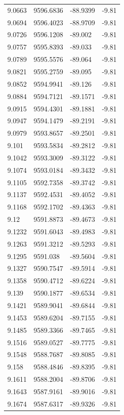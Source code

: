 \begin{table}[H]
\begin{tabular}{llll}
9.0663 & 9596.6836 & -88.9399 & -9.81 \\
9.0694 & 9596.4023 & -88.9709 & -9.81 \\
9.0726 & 9596.1208 & -89.002 & -9.81 \\
9.0757 & 9595.8393 & -89.033 & -9.81 \\
9.0789 & 9595.5576 & -89.064 & -9.81 \\
9.0821 & 9595.2759 & -89.095 & -9.81 \\
9.0852 & 9594.9941 & -89.126 & -9.81 \\
9.0884 & 9594.7121 & -89.1571 & -9.81 \\
9.0915 & 9594.4301 & -89.1881 & -9.81 \\
9.0947 & 9594.1479 & -89.2191 & -9.81 \\
9.0979 & 9593.8657 & -89.2501 & -9.81 \\
9.101 & 9593.5834 & -89.2812 & -9.81 \\
9.1042 & 9593.3009 & -89.3122 & -9.81 \\
9.1074 & 9593.0184 & -89.3432 & -9.81 \\
9.1105 & 9592.7358 & -89.3742 & -9.81 \\
9.1137 & 9592.4531 & -89.4052 & -9.81 \\
9.1168 & 9592.1702 & -89.4363 & -9.81 \\
9.12 & 9591.8873 & -89.4673 & -9.81 \\
9.1232 & 9591.6043 & -89.4983 & -9.81 \\
9.1263 & 9591.3212 & -89.5293 & -9.81 \\
9.1295 & 9591.038 & -89.5604 & -9.81 \\
9.1327 & 9590.7547 & -89.5914 & -9.81 \\
9.1358 & 9590.4712 & -89.6224 & -9.81 \\
9.139 & 9590.1877 & -89.6534 & -9.81 \\
9.1421 & 9589.9041 & -89.6844 & -9.81 \\
9.1453 & 9589.6204 & -89.7155 & -9.81 \\
9.1485 & 9589.3366 & -89.7465 & -9.81 \\
9.1516 & 9589.0527 & -89.7775 & -9.81 \\
9.1548 & 9588.7687 & -89.8085 & -9.81 \\
9.158 & 9588.4846 & -89.8395 & -9.81 \\
9.1611 & 9588.2004 & -89.8706 & -9.81 \\
9.1643 & 9587.9161 & -89.9016 & -9.81 \\
9.1674 & 9587.6317 & -89.9326 & -9.81 \\

\end{tabular}
\end{table}
